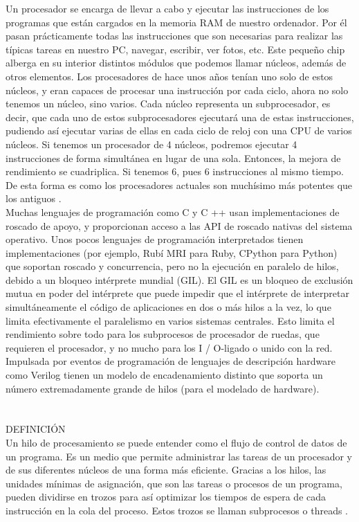 \documentclass[conference]{IEEEtran}
\begin{document}
Un procesador se encarga de llevar a cabo y ejecutar las instrucciones de los programas que están cargados en la memoria RAM de nuestro ordenador. Por él pasan prácticamente todas las instrucciones que son necesarias para realizar las típicas tareas en nuestro PC, navegar, escribir, ver fotos, etc. Este pequeño chip alberga en su interior distintos módulos que podemos llamar núcleos, además de otros elementos. Los procesadores de hace unos años tenían uno solo de estos núcleos, y eran capaces de procesar una instrucción por cada ciclo, ahora no solo tenemos un núcleo, sino varios. Cada núcleo representa un subprocesador, es decir, que cada uno de estos subprocesadores ejecutará una de estas instrucciones, pudiendo así ejecutar varias de ellas en cada ciclo de reloj con una CPU de varios núcleos. Si tenemos un procesador de 4 núcleos, podremos ejecutar 4 instrucciones de forma simultánea en lugar de una sola. Entonces, la mejora de rendimiento se cuadriplica. Si tenemos 6, pues 6 instrucciones al mismo tiempo. De esta forma es como los procesadores actuales son muchísimo más potentes que los antiguos \cite{b2}.
\\
Muchas lenguajes de programación como C y C ++ usan implementaciones de roscado de apoyo, y proporcionan acceso a las API de roscado nativas del sistema operativo.
Unos pocos lenguajes de programación interpretados tienen implementaciones (por ejemplo, Rubí MRI para Ruby, CPython para Python) que soportan roscado y concurrencia, pero no la ejecución en paralelo de hilos, debido a un bloqueo intérprete mundial (GIL). El GIL es un bloqueo de exclusión mutua en poder del intérprete que puede impedir que el intérprete de interpretar simultáneamente el código de aplicaciones en dos o más hilos a la vez, lo que limita efectivamente el paralelismo en varios sistemas centrales. Esto limita el rendimiento sobre todo para los subprocesos de procesador de ruedas, que requieren el procesador, y no mucho para los I / O-ligado o unido con la red.
\\
Impulsada por eventos de programación de lenguajes de descripción hardware como Verilog tienen un modelo de encadenamiento distinto que soporta un número extremadamente grande de hilos (para el modelado de hardware).
\\
\\
\\
DEFINICIÓN 
\\
Un hilo de procesamiento se puede entender como el flujo de control de datos de un programa. Es un medio que permite administrar las tareas de un procesador y de sus diferentes núcleos de una forma más eficiente. Gracias a los hilos, las unidades mínimas de asignación, que son las tareas o procesos de un programa, pueden dividirse en trozos para así optimizar los tiempos de espera de cada instrucción en la cola del proceso. Estos trozos se llaman subprocesos o threads \cite{b2}.
\end{document}
